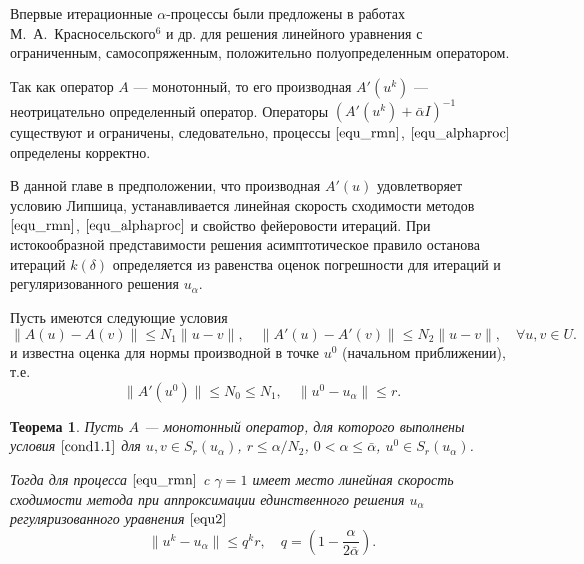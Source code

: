\documentclass[%
autoref,     %
href,        %
facsimile,   %
colorlinks,  %
]{disser}
\newtheorem{theorem}{Теорема}
\begin{document}
Впервые итерационные $\alpha$-процессы были предложены в работах М.~А.~Крас\-носельского$^6$ и др. для решения линейного уравнения с ограниченным, самосопряженным, положительно полуопределенным оператором.

{\scriptsize
	\let\thefootnote\relax\let\thefootnote\relax{}
}

Так как оператор $A$ --- монотонный, то его производная $A'(u^k)$ --- неотрицательно определенный оператор. Операторы $(A'(u^k)+\bar\alpha I)^{-1}$ существуют и ограничены, следовательно, процессы $\eqref{equ_rmn}$, $\eqref{equ_alphaproc}$ определены корректно.

В данной главе в предположении, что производная $A'(u)$ удовлетворяет условию Липшица, устанавливается линейная скорость сходимости методов $\eqref{equ_rmn}$,  $\eqref{equ_alphaproc}$ и свойство фейеровости итераций. При истокообразной представимости решения асимптотическое правило останова итераций $k(\delta)$ определяется из равенства оценок погрешности для итераций и регуляризованного решения $u_\alpha$.

Пусть имеются следующие условия
\begin{equation}\label{cond1.1}
\|A(u)-A(v)\|\leqslant N_1\|u-v\|, \quad
\|A'(u)-A'(v)\|\leqslant N_2\|u-v\|, \quad \forall u, v \in U.
\end{equation}
и известна оценка для нормы производной в точке $u^0$ (начальном приближении), т.е.
\begin{equation}\label{cond1.3}
\|A'(u^0)\| \leqslant N_0\leqslant N_1, \quad \|u^0-u_\alpha\| \leqslant r.
\end{equation}

\begin{theorem}\label{teo2.1} Пусть $A$ --- монотонный оператор, для которого выполнены условия $\eqref{cond1.1}$ для $u, v \in S_r(u_\alpha)$, $r\leqslant \alpha/N_2$, $0<\alpha \leqslant \bar\alpha$, $u^0 \in S_r(u_\alpha)$. 
	
	Тогда для процесса $\eqref{equ_rmn}$ c $\gamma=1$ имеет место линейная скорость сходимости метода при аппроксимации единственного решения $u_\alpha$ регуляризованного уравнения $\eqref{equ2}$
	\begin{equation}\label{nwt_conv}
	\| u^k-u_\alpha \| \leqslant q^kr, \quad q=(1-\frac{\alpha}{2\bar\alpha}).
	\end{equation}
\end{theorem}
\end{document}
